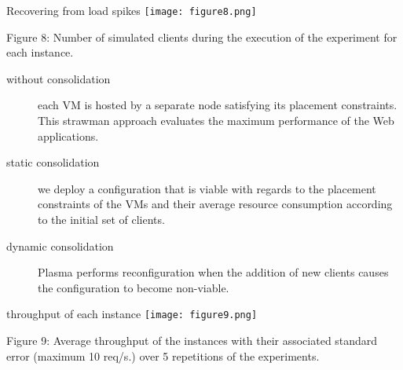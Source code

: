 \begin{frame}{Recovering from load spikes}
\texttt{[image: figure8.png]} 

Figure 8: Number of simulated clients during the execution of the experiment
for each instance.
\br
 \pause{}
\begin{description}
\item[without consolidation] each VM is hosted by a separate
node satisfying its placement constraints. This strawman approach evaluates
the maximum performance of the Web applications.
 \pause{}
\item[static consolidation] we deploy a configuration that is viable with regards to
the placement constraints of the VMs and their average resource consumption
according to the initial set of clients.
 \pause{}
\item[dynamic consolidation] Plasma performs reconfiguration when the addition of new clients causes
the configuration to become non-viable.
 \pause{}
\end{description}
\end{frame}
\begin{frame}{throughput of each instance}
\texttt{[image: figure9.png]} 

Figure 9: Average throughput of the instances with their associated standard
error (maximum 10 req/s.) over 5 repetitions of the experiments.

\end{frame}

